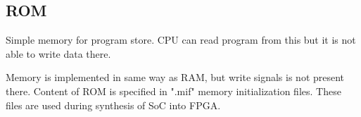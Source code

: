 \subsection{ROM}

Simple memory for program store. CPU can read program from this but it is not
able to write data there.

Memory is implemented in same way as RAM, but write signals is not present
there. Content of ROM is specified in ".mif" memory initialization files. These
files are used during synthesis of SoC into FPGA.
